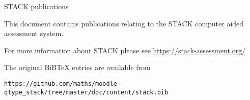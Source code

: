 \documentclass[11pt]{article}
\newcommand{\localputbib}{%
\putbib[stack]
}
\begin{document}


\centerline{\Large STACK publications}
$~$\\[1cm]

This document contains publications relating to the STACK computer aided assessment system.

For more information about STACK please see \href{https://stack-assessment.org/}{https://stack-assessment.org/}

The original BiBTeX entries are available from
{\scriptsize
\begin{verbatim}
https://github.com/maths/moodle-qtype_stack/tree/master/doc/content/stack.bib
\end{verbatim}
}

\renewcommand\refname{\normalsize Suggestions of where to start}
\begin{bibunit}[unsrt]
\nocite{Kinnear2021,2023-Proof-Assessment,2017MCQ,2013CAA,2022-STACK-Edinburgh}
\localputbib
\end{bibunit}

\renewcommand\refname{\normalsize Books}
\begin{bibunit}[unsrt]
\nocite{2013CAA,Nakamura2010}
\localputbib
\end{bibunit}

\newpage 

\renewcommand\refname{\normalsize Specific issues}
\begin{bibunit}[unsrt]
\nocite{SangwinRamsden2006,Nakamura2016b,2017STACKUnits,2018Sangwin-equivalence-proof,Sangwin2015Inequalities}
\localputbib
\end{bibunit}

\renewcommand\refname{\normalsize STACK and Examinations}
\begin{bibunit}[unsrt]
\nocite{Sangwin2019CERME,2016AutomationExaminations,Sangwin2019CERME,Sangwin2018CMEEI}
\localputbib
\end{bibunit}

\renewcommand\refname{\normalsize Research and conference papers}
\begin{bibunit}[unsrt]
\nocite{Gratwick2020,Akveld2023,2018Mastery,Yoshitomi2018,Barbas2016,Nakamura2016,Sangwin2015KHDM}
\nocite{Rasila2016,Rasila2016b,Rasila2016c}
\nocite{Shirai2015a,Shirai2015b,Pavia2015,Nakamura2014,Shirai2014,Nakamura2013}
\nocite{Sangwin2012ICME,Sangwin2013HEA,Lowe2010,Sangwin2009Equality,Sangwin2010IGI,Nakamura2010b}
\nocite{Rasila2010,Sangwin2009Calculumus,Sangwin2009ICMI,Rasila2007}
\nocite{Sangwin2006CASAlgebra,WebALT2006,Sangwin2006UniServe,SangwinTMA03,SangwinHSkills02}
\nocite{lowe_mestel_2019,erskine_mestel_2018,Paiva2017}
\localputbib
\end{bibunit}
\end{document}
